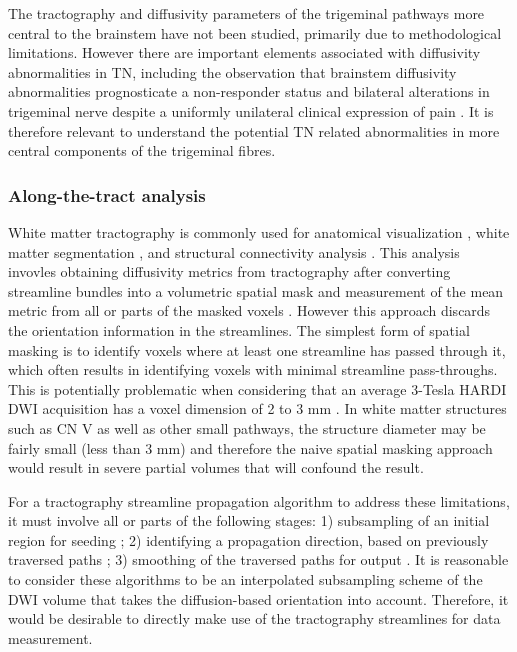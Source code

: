 The tractography and diffusivity parameters of the trigeminal pathways more central to the brainstem have not been studied, primarily due to methodological limitations. However there are important elements associated with diffusivity abnormalities in TN, including the observation that brainstem diffusivity abnormalities prognosticate a non-responder status \cite{Hung2017} and bilateral alterations in trigeminal nerve despite a uniformly unilateral clinical expression of pain \cite{Miller2009}. It is therefore relevant to understand the potential TN related abnormalities in more central components of the trigeminal fibres.  

\subsubsection{Along-the-tract analysis}
White matter tractography is commonly used for anatomical visualization \cite{Chen2011b}, white matter segmentation \cite{Behrens2003a,Johansen-Berg2005}, and structural connectivity analysis \cite{Cao2013,Wiech2014}. This analysis invovles obtaining diffusivity metrics from tractography after converting streamline bundles into a volumetric spatial mask and measurement of the mean metric from all or parts of the masked voxels \cite{Concha2005,Fitzsimmons2009}. However this approach discards the orientation information in the streamlines. The simplest form of spatial masking is to identify voxels where at least one streamline has passed through it, which often results in identifying voxels with minimal streamline pass-throughs. This is potentially problematic when considering that an average 3-Tesla HARDI DWI acquisition has a voxel dimension of 2 to 3 mm \cite{Neher2015,Wilkins2015}. In white matter structures such as CN V as well as other small pathways, the structure diameter may be fairly small (less than 3 mm) and therefore the naive spatial masking approach would result in severe partial volumes that will confound the result. 

For a tractography streamline propagation algorithm to address these limitations, it must involve all or parts of the following stages: 1) subsampling of an initial region for seeding \cite{Basser2002,Cote2012}; 2) identifying a propagation direction, based on previously traversed paths \cite{Malcolm2010,Qazi2009,Tournier2010}; 3) smoothing of the traversed paths for output \cite{Tuch2000d}. It is reasonable to consider these algorithms to be an interpolated subsampling scheme of the DWI volume that takes the diffusion-based orientation into account. Therefore, it would be desirable to directly make use of the tractography streamlines for data measurement. 

